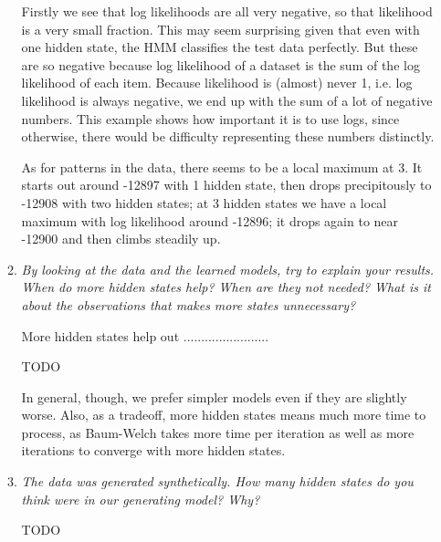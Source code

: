 \documentclass{article}
\begin{document}
\begin{enumerate}[(a)]
\begin{enumerate}
    Firstly we see that log likelihoods are all very negative, so that likelihood
    is a very small fraction. This may seem surprising given that even with one 
    hidden state, the HMM classifies the test data perfectly. But these are so 
    negative because log likelihood of a dataset is the sum of the log likelihood
    of each item. Because likelihood is (almost) never 1, i.e. log likelihood is always
    negative, we end up with the sum of a lot of negative numbers. 
    This example shows how
    important it is to use logs, since otherwise, there would be difficulty
    representing these numbers distinctly. 

    As for patterns in the data, there seems to be a local maximum at 3. It starts
    out around -12897 with 1 hidden state, then drops precipitously to -12908 with
    two hidden states; at 3 hidden states we have a local maximum with log likelihood
    around -12896; it drops again to near -12900 and then climbs steadily up. 

  \item \emph{By looking at the data and the learned models, try to explain your
    results. When do more hidden states help? When are they not needed? What is
    it about the observations that makes more states unnecessary?}

    More hidden states help out ........................
    
    TODO

    In general, though, we prefer simpler models even if they are slightly
    worse. Also, as a tradeoff, more hidden states means much more time to process, 
    as Baum-Welch takes more time per iteration as well as more iterations to
    converge with more hidden states.     

  \item \emph{The data was generated synthetically. How many hidden states do you
    think were in our generating model? Why?}

    TODO

  \end{enumerate}
\end{enumerate}
\end{document}
